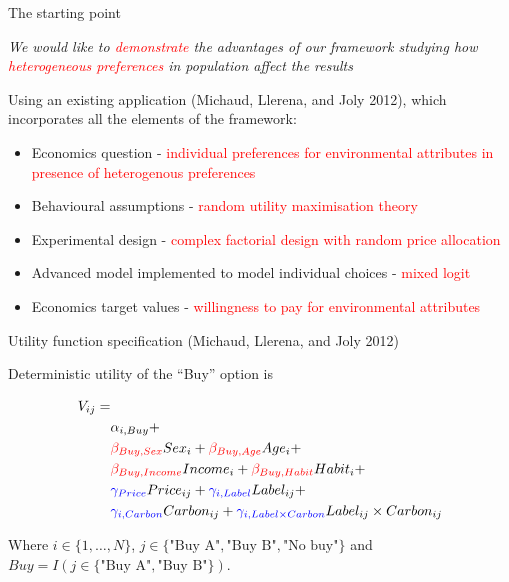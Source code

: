 \documentclass[11pt,ignorenonframetext,]{beamer}
\providecommand{\tightlist}{%
  \setlength{\itemsep}{0pt}\setlength{\parskip}{0pt}}
\begin{document}
\begin{frame}{The starting point}
\protect\hypertarget{the-starting-point}{}

\emph{We would like to \textcolor{red}{demonstrate} the advantages of
our framework studying how \textcolor{red}{heterogeneous preferences} in
population affect the results}

Using an existing application (Michaud, Llerena, and Joly 2012), which
incorporates all the elements of the framework:

\begin{itemize}
\tightlist
\item
  Economics question -
  \textcolor{red}{individual preferences for environmental attributes in presence of heterogenous preferences}
\item
  Behavioural assumptions -
  \textcolor{red}{random utility maximisation theory}
\item
  Experimental design -
  \textcolor{red}{complex factorial design with random price allocation}
\item
  Advanced model implemented to model individual choices -
  \textcolor{red}{mixed logit}
\item
  Economics target values -
  \textcolor{red}{willingness to pay for environmental attributes}
\end{itemize}

\end{frame}

\begin{frame}{Utility function specification (Michaud, Llerena, and Joly
2012)}
\protect\hypertarget{utility-function-specification-llerena2013rose}{}

Deterministic utility of the ``Buy'' option is

\begin{align}
V_{ij} = & \nonumber \\
    & \alpha_{i,Buy} + \nonumber \\
    & \textcolor{red}{\beta_{Buy, Sex}} Sex_i + \textcolor{red}{\beta_{Buy, Age}} Age_i + \nonumber \\
    & \textcolor{red}{\beta_{Buy, Income}} Income_i + \textcolor{red}{\beta_{Buy, Habit}} Habit_i + \\
    & \textcolor{blue}{\gamma_{Price}} Price_{ij} + \textcolor{blue}{\gamma_{i, Label}} Label_{ij} + \nonumber \\ 
    & \textcolor{blue}{\gamma_{i, Carbon}} Carbon_{ij} + \textcolor{blue}{\gamma_{i, Label \times Carbon}} Label_{ij} \times Carbon_{ij} \nonumber 
\end{align}

\scriptsize

Where \(i \in \{1, \dots, N\}\),
\(j \in \{\text{"Buy A"}, \text{"Buy B"}, \text{"No buy"}\}\) and
\(Buy = I(j \in \{\text{"Buy A"}, \text{"Buy B"}\})\). \normalsize 

\end{frame}
\end{document}
